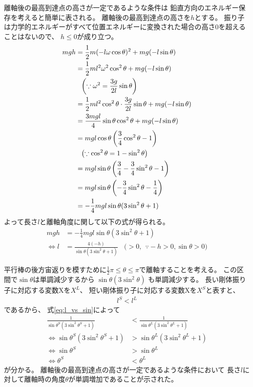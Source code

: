 \documentclass[a4paper,11pt]{jsarticle}
\begin{document}
離軸後の最高到達点の高さが一定であるような条件は
鉛直方向のエネルギー保存を考えると簡単に表される。
離軸後の最高到達点の高さを$h$とする。
振り子は力学的エネルギーがすべて位置エネルギーに変換された場合の高さ$0$を超えることはないので、
$h\leq0$が成り立つ。
\begin{align}
  mgh 
  &= \frac{1}{2}m (-l \omega \cos \theta)^2 + mg (-l \sin \theta)
  \label{eq:energy_vertical}
  \\
  &= \frac{1}{2}ml^2 \omega^2 \cos^2 \theta + mg (-l \sin \theta)
  \\
  & \ \ \left( \because \omega^2 = \frac{3g}{2l}\sin\theta \right) \notag
  \\
  &= \frac{1}{2}ml^2 \cos^2 \theta \cdot \frac{3g}{2l}\sin\theta + mg (-l \sin \theta)
  \\
  &= \frac{3mgl}{4}\sin\theta \cos^2\theta + mg (-l\sin\theta)
  \\
  &= mgl\cos\theta \left( \frac{3}{4}\cos^2\theta - 1\right)
  \\
  & \ \ \left( \because \cos^2\theta = 1 - \sin^2\theta \right) \notag
  \\
  &= mgl\sin\theta \left( \frac{3}{4} - \frac{3}{4}\sin^2\theta - 1 \right)
  \\
  &= mgl\sin\theta \left( - \frac{3}{4}\sin^2\theta - \frac{1}{4} \right)
  \\
  &= -\frac{1}{4}mgl\sin\theta (3\sin^2\theta + 1)
\end{align}
よって長さ$l$と離軸角度に関して以下の式が得られる。
\begin{align}
  mgh &= -\frac{1}{4}mgl \sin\theta (3\sin^2\theta + 1)
  \label{eq:energy_vertical:conclusion}
  \\
  \Leftrightarrow
  l &= \frac{4(-h)}{\sin\theta (3\sin^2\theta + 1)} \ \ \ \ \Big( > 0, \ \ \because -h > 0, \sin\theta > 0 \Big)
  \label{eq:l_vs_sin}
\end{align}

平行棒の後方宙返りを模すために$\frac{1}{2}\pi \leq \theta \leq \pi$で離軸することを考える。
この区間で$\sin\theta$は単調減少するから
$\sin\theta (3\sin^2\theta)$ も単調減少する。
長い剛体振り子に対応する変数Xを$X^L$、
短い剛体振り子に対応する変数Xを$X^S$と表すと、
\begin{align}
  l^S < l^L
\end{align}
であるから、
式\ref{eq:l_vs_sin}によって
\begin{align}
  \frac{1}{\sin\theta^S (3\sin^2\theta^S + 1)} &< \frac{1}{\sin\theta^L (3\sin^2\theta^L + 1)}
  \\
  \Leftrightarrow
  \sin\theta^S (3\sin^2\theta^S + 1) &> \sin\theta^L (3\sin^2\theta^L + 1)
  \\
  \Leftrightarrow
  \sin\theta^S &> \sin\theta^L
  \\
  \Leftrightarrow
  \theta^S &< \theta^L
\end{align}
が分かる。
離軸後の最高到達点の高さが一定であるような条件において
長さ$l$に対して離軸時の角度$\theta$が単調増加であることが示された。
\end{document}

